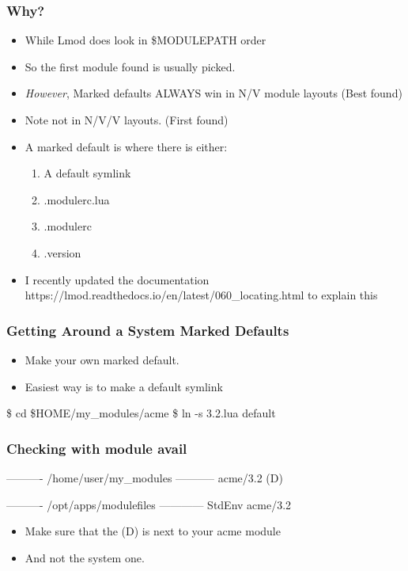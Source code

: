 \documentclass{beamer}
\begin{document}
\begin{frame}[fragile]
    \frametitle{Why?}
  \begin{itemize}
    \item While Lmod does look in \$MODULEPATH order
    \item So the first module found is usually picked.
    \item {\color{red}\emph{However}}, Marked defaults ALWAYS win in
      N/V module layouts (Best found)
    \item Note not in N/V/V layouts. (First found)
    \item A marked default is where there is either:
      \begin{enumerate}
        \item A default symlink
        \item .modulerc.lua
        \item .modulerc
        \item .version
      \end{enumerate}
    \item I recently updated the documentation
      https://lmod.readthedocs.io/en/latest/060\_locating.html
      to explain this
  \end{itemize}
\end{frame}

\begin{frame}[fragile]
    \frametitle{Getting Around a System Marked Defaults}
  \begin{itemize}
    \item Make your own marked default.
    \item Easiest way is to make a default symlink
  \end{itemize}
 {\tiny
    \begin{semiverbatim}
        \$ cd \$HOME/my\_modules/acme
        \$ ln -s 3.2.lua default
    \end{semiverbatim}
}
\end{frame}



\begin{frame}[fragile]
    \frametitle{Checking with module avail}
 {\tiny
    \begin{semiverbatim}
   ---------- /home/user/my\_modules -----------
   acme/3.2 (D) 
 
   ---------- /opt/apps/modulefiles ------------
   StdEnv    acme/3.2

    \end{semiverbatim}
}
  \begin{itemize}
    \item Make sure that the (D) is next to your acme module 
    \item And not the system one.
  \end{itemize}
\end{frame}
\end{document}
